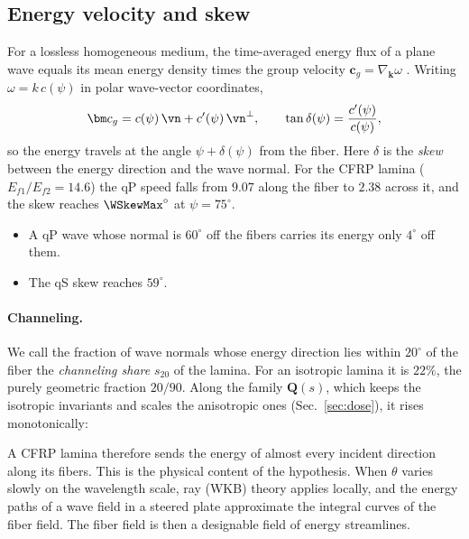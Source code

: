 \subsection{Energy velocity and skew}
For a lossless homogeneous medium, the time-averaged energy flux of a plane wave equals
its mean energy density times the group velocity $\bm c_g=\nabla_{\bm k}\omega$
\cite{auld}. Writing $\omega=k\,c(\psi)$ in polar wave-vector coordinates,
\begin{equation}
\bm c_g=c(\psi)\,\vn+c'(\psi)\,\vn^\perp,\qquad
\tan\delta(\psi)=\frac{c'(\psi)}{c(\psi)} ,
\label{eq:skew}
\end{equation}
so the energy travels at the angle $\psi+\delta(\psi)$ from the fiber. Here $\delta$ is
the \emph{skew} between the energy direction and the wave normal. For the CFRP lamina
($E_{f1}/E_{f2}=14.6$) the qP speed falls from $9.07$ along the fiber to $2.38$ across
it, and the skew reaches $\WSkewMax^\circ$ at $\psi=75^\circ$.
\begin{itemize}[itemsep=1pt]
\item A qP wave whose normal is $60^\circ$ off the fibers carries its energy only
$4^\circ$ off them.
\item The qS skew reaches $59^\circ$.
\end{itemize}

\paragraph{Channeling.} We call the fraction of wave normals whose energy direction lies
within $20^\circ$ of the fiber the \emph{channeling share} $s_{20}$ of the lamina. For
an isotropic lamina it is $22\%$, the purely geometric fraction $20/90$. Along the
family $\mathbf Q(s)$, which keeps the isotropic invariants and scales the anisotropic
ones (Sec.~\ref{sec:dose}), it rises monotonically:
\begin{center}\small
{}
\end{center}
A CFRP lamina therefore sends the energy of almost every incident direction along its
fibers. This is the physical content of the hypothesis. When $\theta$ varies slowly on
the wavelength scale, ray (WKB) theory applies locally, and the energy paths of a
wave field in a steered plate approximate the integral curves of the fiber field. The
fiber field is then a designable field of energy streamlines.

